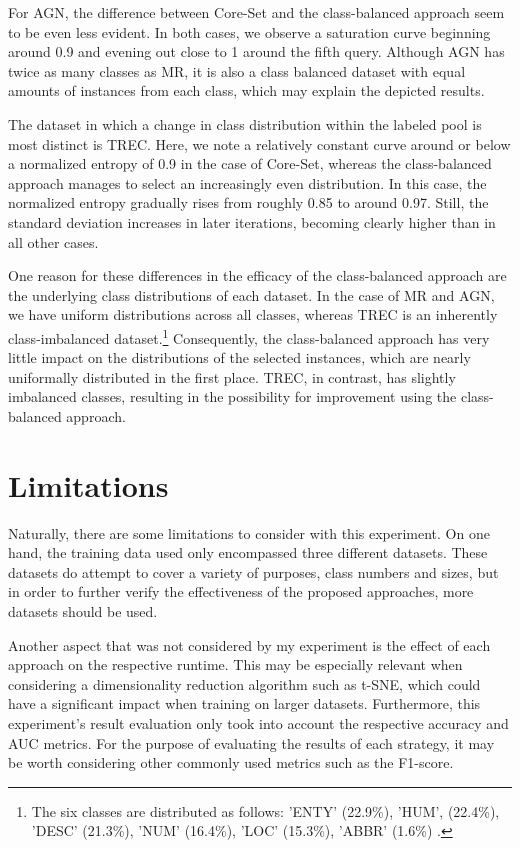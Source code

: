 \documentclass[english,bachelor,ul]{webisthesis} %
\begin{document}
For AGN, the difference between Core-Set and the class-balanced approach seem to be even less evident. In both cases, we observe a saturation curve beginning around 0.9 and evening out close to 1 around the fifth query. Although AGN has twice as many classes as MR, it is also a class balanced dataset with equal amounts of instances from each class, which may explain the depicted results.

The dataset in which a change in class distribution within the labeled pool is most distinct is TREC. Here, we note a relatively constant curve around or below a normalized entropy of 0.9 in the case of Core-Set, whereas the class-balanced approach manages to select an increasingly even distribution. In this case, the normalized entropy gradually rises from roughly 0.85 to around 0.97. Still, the standard deviation increases in later iterations, becoming clearly higher than in all other cases. 

One reason for these differences in the efficacy of the class-balanced approach are the underlying class distributions of each dataset. In the case of MR and AGN, we have uniform distributions across all classes, whereas TREC is an inherently class-imbalanced dataset.\footnote{The six classes are distributed as follows: 'ENTY' (22.9\%), 'HUM', (22.4\%), 'DESC' (21.3\%), 'NUM' (16.4\%), 'LOC' (15.3\%), 'ABBR' (1.6\%) \citep{DBLP:journals/nle/LiR06}.} Consequently, the class-balanced approach has very little impact on the distributions of the selected instances, which are nearly uniformally distributed in the first place. TREC, in contrast, has slightly imbalanced classes, resulting in the possibility for improvement using the class-balanced approach.

\section{Limitations}

Naturally, there are some limitations to consider with this experiment. On one hand, the training data used only encompassed three different datasets. These datasets do attempt to cover a variety of purposes, class numbers and sizes, but in order to further verify the effectiveness of the proposed approaches, more datasets should be used. 

Another aspect that was not considered by my experiment is the effect of each approach on the respective runtime. This may be especially relevant when considering a dimensionality reduction algorithm such as t-SNE, which could have a significant impact when training on larger datasets. Furthermore, this experiment's result evaluation only took into account the respective accuracy and AUC metrics. For the purpose of evaluating the results of each strategy, it may be worth considering other commonly used metrics such as the F1-score.
\end{document}
